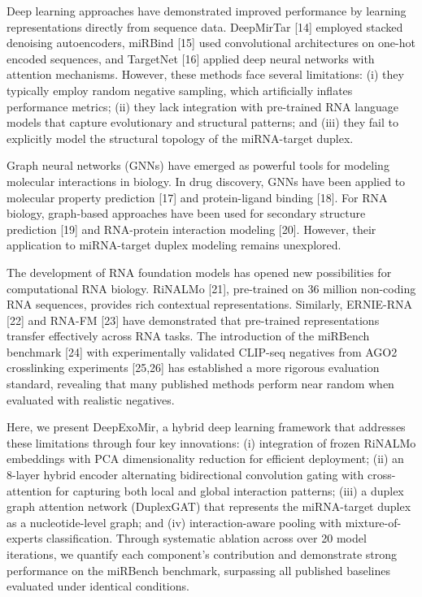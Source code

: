 \documentclass[sn-mathphys-num]{sn-jnl}
\begin{document}
Deep learning approaches have demonstrated improved performance by learning representations directly from sequence data. DeepMirTar [14] employed stacked denoising autoencoders, miRBind [15] used convolutional architectures on one-hot encoded sequences, and TargetNet [16] applied deep neural networks with attention mechanisms. However, these methods face several limitations: (i) they typically employ random negative sampling, which artificially inflates performance metrics; (ii) they lack integration with pre-trained RNA language models that capture evolutionary and structural patterns; and (iii) they fail to explicitly model the structural topology of the miRNA-target duplex.

Graph neural networks (GNNs) have emerged as powerful tools for modeling molecular interactions in biology. In drug discovery, GNNs have been applied to molecular property prediction [17] and protein-ligand binding [18]. For RNA biology, graph-based approaches have been used for secondary structure prediction [19] and RNA-protein interaction modeling [20]. However, their application to miRNA-target duplex modeling remains unexplored.

The development of RNA foundation models has opened new possibilities for computational RNA biology. RiNALMo [21], pre-trained on 36 million non-coding RNA sequences, provides rich contextual representations. Similarly, ERNIE-RNA [22] and RNA-FM [23] have demonstrated that pre-trained representations transfer effectively across RNA tasks. The introduction of the miRBench benchmark [24] with experimentally validated CLIP-seq negatives from AGO2 crosslinking experiments [25,26] has established a more rigorous evaluation standard, revealing that many published methods perform near random when evaluated with realistic negatives.

Here, we present DeepExoMir, a hybrid deep learning framework that addresses these limitations through four key innovations: (i) integration of frozen RiNALMo embeddings with PCA dimensionality reduction for efficient deployment; (ii) an 8-layer hybrid encoder alternating bidirectional convolution gating with cross-attention for capturing both local and global interaction patterns; (iii) a duplex graph attention network (DuplexGAT) that represents the miRNA-target duplex as a nucleotide-level graph; and (iv) interaction-aware pooling with mixture-of-experts classification. Through systematic ablation across over 20 model iterations, we quantify each component's contribution and demonstrate strong performance on the miRBench benchmark, surpassing all published baselines evaluated under identical conditions.
\end{document}
